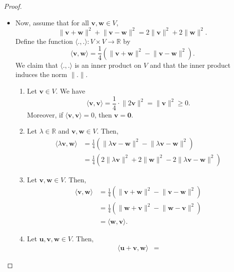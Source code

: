 \documentclass[a4paper, openany]{memoir}
\theoremstyle{definition}
\theoremstyle{plain}
\begin{document}
\begin{proof}
\begin{itemize}
        \item Now, assume that for all $\bm{v}, \bm{w} \in V$, 
        \[\lVert \bm{v} + \bm{w} \rVert^2 + \lVert \bm{v} - \bm{w} \rVert^2 = 2\lVert \bm{v} \rVert^2 + 2\lVert \bm{w} \rVert^2.\]
        Define the function $\langle ., . \rangle: V \times V \to \mathbb{R}$ by
        \[\langle \bm{v}, \bm{w} \rangle = \frac{1}{4} (\lVert \bm{v} + \bm{w} \rVert^2 - \lVert \bm{v} - \bm{w} \rVert^2).\]
        We claim that $\langle ., . \rangle$ is an inner product on $V$ and that the inner product induces the norm $\lVert . \rVert$.
        \begin{enumerate}[label=\textbf{I\arabic*.}]
            \item Let $\bm{v} \in V$. We have
            \[\langle \bm{v}, \bm{v} \rangle = \frac{1}{4} \cdot \lVert 2\bm{v} \rVert^2 = \lVert \bm{v} \rVert^2 \geq 0.\]
            Moreover, if $\langle \bm{v}, \bm{v} \rangle = 0$, then $\bm{v} = \bm{0}$.
            \item Let $\lambda \in \mathbb{R}$ and $\bm{v}, \bm{w} \in V$. Then,
            \begin{align*}
                \langle \lambda \bm{v}, \bm{w} \rangle &= \frac{1}{4} (\lVert \lambda \bm{v} - \bm{w} \rVert^2 - \lVert \lambda \bm{v} - \bm{w} \rVert^2) \\
                &= \frac{1}{4}(2\lVert \lambda \bm{v} \rVert^2 + 2\lVert \bm{w} \rVert^2 - 2\lVert \lambda \bm{v} - \bm{w} \rVert^2) 
            \end{align*}
            \item Let $\bm{v}, \bm{w} \in V$. Then,
            \begin{align*}
                \langle \bm{v}, \bm{w} \rangle &= \frac{1}{4}(\lVert \bm{v} + \bm{w} \rVert^2 - \lVert \bm{v} - \bm{w} \rVert^2) \\
                &= \frac{1}{4}(\lVert \bm{w} + \bm{v} \rVert^2 - \lVert \bm{w} - \bm{v} \rVert^2) \\
                &= \langle \bm{w}, \bm{v} \rangle.
            \end{align*}
            \item Let $\bm{u}, \bm{v}, \bm{w} \in V$. Then,
            \begin{align*}
                \langle \bm{u} + \bm{v}, \bm{w} \rangle &= 
            \end{align*}
        \end{enumerate}
    \end{itemize}
\end{proof}
\end{document}
